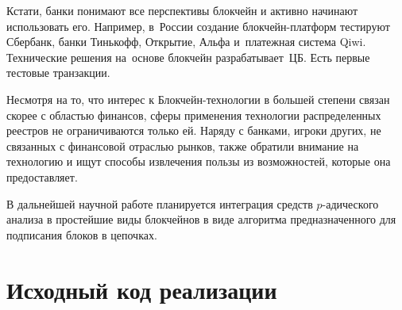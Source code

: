 \documentclass[och, master, pract]{SCWorks_fix}
\theoremstyle{plain}
\theoremstyle{plain}
\theoremstyle{plain}
\theoremstyle{definition}
\begin{document}
Кстати, банки понимают все перспективы блокчейн и активно начинают использовать его. Например, в России создание блокчейн-платформ тестируют Сбербанк, банки Тинькофф, Открытие, Альфа и платежная система Qiwi. Технические решения на основе блокчейн разрабатывает ЦБ. Есть первые тестовые транзакции.

Несмотря на то, что интерес к Блокчейн-технологии в большей степени связан скорее с областью финансов, сферы применения технологии распределенных реестров не ограничиваются только ей. Наряду с банками, игроки других, не связанных с финансовой отраслью рынков, также обратили внимание на технологию и ищут способы извлечения пользы из возможностей, которые она предоставляет.


\conclusion
В дальнейшей научной работе планируется интеграция средств $p$-адического анализа в простейшие виды блокчейнов в виде алгоритма предназначенного для подписания блоков в цепочках.






\appendix
\section{Исходный код реализации}


\end{document}
